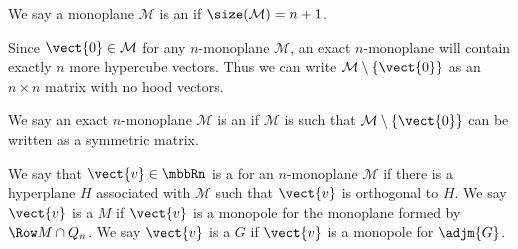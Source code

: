 \begin{definition}
	We say a monoplane $\mathcal{M}$ is an  if $\size(\mathcal{M})=n+1$.
\end{definition}

Since $\vect{0}\in\mathcal{M}$ for any $n$-monoplane $\mathcal{M}$, an exact $n$-monoplane will contain exactly $n$ more hypercube vectors. Thus we can write $\mathcal{M}\setminus\{\vect{0}\}$ as an $n\times n$ matrix with no hood vectors.

\begin{definition}%
	We say an exact $n$-monoplane $\mathcal{M}$ is an  if $\mathcal{M}$ is  such that $\mathcal{M}\setminus\left\{\vect{0}\right\}$ can be written as a symmetric matrix.
\end{definition}

\begin{definition}[monopole]
	We say that $\vect{v}\in\mbbRn$ is a  for an $n$-monoplane $\mathcal{M}$ if there is a hyperplane $H$ associated with $\mathcal{M}$ such that $\vect{v}$ is orthogonal to $H$. We say $\vect{v}$ is a  $M$ if $\vect{v}$ is a monopole for the monoplane formed by $\Row M \cap Q_n$. We say $\vect{v}$ is a  $G$ if $\vect{v}$ is a monopole for $\adjm{G}$. 
\end{definition}


